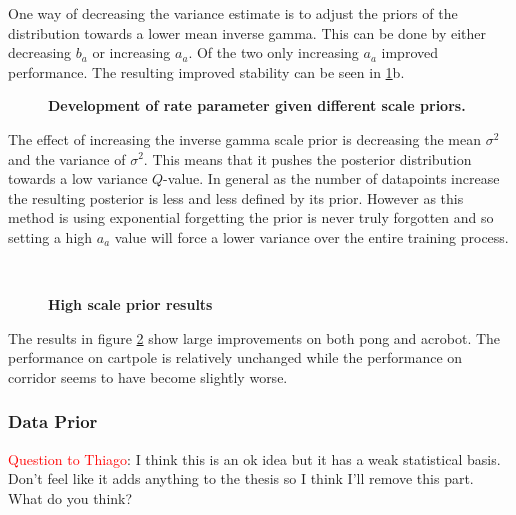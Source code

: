 One way of decreasing the variance estimate is to adjust the priors of the distribution towards a lower mean inverse gamma. This can be done by either decreasing $b_a$ or increasing $a_a$. Of the two only increasing $a_a$ improved performance. The resulting improved stability can be seen in \ref{fig:scale_stability}b.

\begin{figure}[H]
    \centering
    \caption{\textbf{Development of rate parameter given different scale priors.}}
    \label{fig:scale_stability}
\end{figure}

The effect of increasing the inverse gamma scale prior is decreasing the mean $\sigma^2$ and the variance of $\sigma^2$. This means that it pushes the posterior distribution towards a low variance $Q$-value. In general as the number of datapoints increase the resulting posterior is less and less defined by its prior. However as this method is using exponential forgetting the prior is never truly forgotten and so setting a high $a_a$ value will force a lower variance over the entire training process.

\begin{figure}[H] 
    \centering 
    \\
    \caption{\textbf{High scale prior results}} 
    \label{fig:high_scale} 
\end{figure}

The results in figure \ref{fig:high_scale} show large improvements on both pong and acrobot. The performance on cartpole is relatively unchanged while the performance on corridor seems to have become slightly worse.

\subsubsection{Data Prior}

\textcolor{red}{Question to Thiago}: I think this is an ok idea but it has a weak statistical basis. Don't feel like it adds anything to the thesis so I think I'll remove this part. What do you think?

